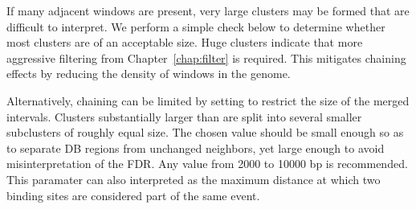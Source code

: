 \documentclass{report}\usepackage[]{graphicx}\usepackage[usenames,dvipsnames]{color}
\newcommand{\hlnum}[1]{\textcolor[rgb]{0.816,0.125,0.439}{#1}}%
\newcommand{\hlopt}[1]{\textcolor[rgb]{0,0,0}{#1}}%
\newcommand{\hlstd}[1]{\textcolor[rgb]{0.251,0.251,0.251}{#1}}%
\newcommand{\hlkwb}[1]{\textcolor[rgb]{0,0,0}{#1}}%
\newcommand{\hlkwc}[1]{\textcolor[rgb]{0.251,0.251,0.251}{#1}}%
\newcommand{\hlkwd}[1]{\textcolor[rgb]{0.878,0.439,0.125}{#1}}%
\newenvironment{knitrout}{}{} %
\begin{document}
If many adjacent windows are present, very large clusters may be formed that are difficult to interpret. 
We perform a simple check below to determine whether most clusters are of an acceptable size. 
Huge clusters indicate that more aggressive filtering from Chapter~\ref{chap:filter} is required.  
This mitigates chaining effects by reducing the density of windows in the genome.


\begin{knitrout}
\color{fgcolor}
\end{knitrout}

Alternatively, chaining can be limited by setting  to restrict the size of the merged intervals. 
Clusters substantially larger than  are split into several smaller subclusters of roughly equal size.
The chosen value should be small enough so as to separate DB regions from unchanged neighbors, yet large enough to avoid misinterpretation of the FDR.
Any value from 2000 to 10000 bp is recommended. 
This paramater can also interpreted as the maximum distance at which two binding sites are considered part of the same event.

\begin{knitrout}
\color{fgcolor}
\end{knitrout}
\end{document}
